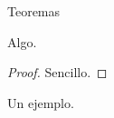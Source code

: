 \documentclass{beamer}
\begin{document}
\begin{frame}{Teoremas}
\begin{theorem}Algo.\end{theorem}
\begin{proof}Sencillo.\end{proof}
\begin{example}Un ejemplo.\end{example}
\end{frame}
\end{document}
